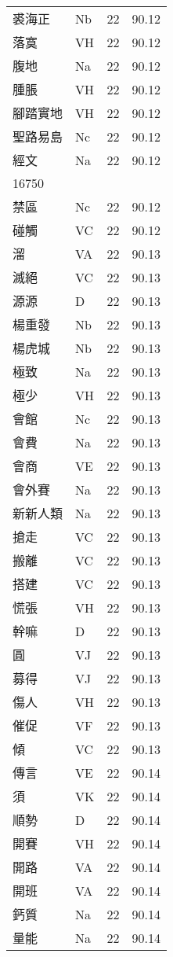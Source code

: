 \documentclass[twocolumn]{book}
\begin{document}
\begin{supertabular}{llrr}
裘海正 & Nb & 22 &  90.12\\
落寞 & VH & 22 &  90.12\\
腹地 & Na & 22 &  90.12\\
腫脹 & VH & 22 &  90.12\\
腳踏實地 & VH & 22 &  90.12\\
聖路易島 & Nc & 22 &  90.12\\
經文 & Na & 22 &  90.12\\
16750\\
禁區 & Nc & 22 &  90.12\\
碰觸 & VC & 22 &  90.12\\
溜 & VA & 22 &  90.13\\
滅絕 & VC & 22 &  90.13\\
源源 & D & 22 &  90.13\\
楊重發 & Nb & 22 &  90.13\\
楊虎城 & Nb & 22 &  90.13\\
極致 & Na & 22 &  90.13\\
極少 & VH & 22 &  90.13\\
會館 & Nc & 22 &  90.13\\
會費 & Na & 22 &  90.13\\
會商 & VE & 22 &  90.13\\
會外賽 & Na & 22 &  90.13\\
新新人類 & Na & 22 &  90.13\\
搶走 & VC & 22 &  90.13\\
搬離 & VC & 22 &  90.13\\
搭建 & VC & 22 &  90.13\\
慌張 & VH & 22 &  90.13\\
幹嘛 & D & 22 &  90.13\\
圓 & VJ & 22 &  90.13\\
募得 & VJ & 22 &  90.13\\
傷人 & VH & 22 &  90.13\\
催促 & VF & 22 &  90.13\\
傾 & VC & 22 &  90.13\\
傳言 & VE & 22 &  90.14\\
須 & VK & 22 &  90.14\\
順勢 & D & 22 &  90.14\\
開賽 & VH & 22 &  90.14\\
開路 & VA & 22 &  90.14\\
開班 & VA & 22 &  90.14\\
鈣質 & Na & 22 &  90.14\\
量能 & Na & 22 &  90.14\\

\end{supertabular}
\end{document}

